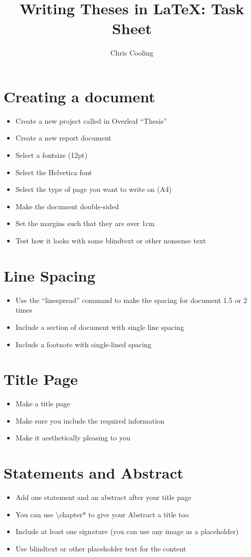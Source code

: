 \documentclass[11pt,a4paper]{article}
\begin{document}
\title{Writing Theses in \LaTeX: Task Sheet}
\author{Chris Cooling}
\maketitle
\pagestyle{empty}
\thispagestyle{empty}

\section{Creating a document}
\begin{itemize}
\item Create a new project called in Overleaf ``Thesis''
\item Create a new report document
\item Select a fontsize (12pt)
\item Select the Helvetica font
\item Select the type of page you want to write on (A4)
\item Make the document double-sided
\item Set the margins such that they are over 1cm
\item Test how it looks with some blindtext or other nonsense text
\end{itemize}

\section{Line Spacing}
\begin{itemize}
\item Use the ``linespread'' command to make the spacing for document 1.5 or 2 times
\item Include a section of document with single line spacing
\item Include a footnote with single-lined spacing
\end{itemize}

\section{Title Page}
\begin{itemize}
\item Make a title page 
\item Make sure you include the required information
\item Make it aesthetically pleasing to you
\end{itemize}

\section{Statements and Abstract}
\begin{itemize}
\item Add one statement and an abstract after your title page
\item You can use \textbackslash chapter* to give your Abstract a title too
\item Include at least one signature (you can use any image as a placeholder)
\item Use blindtext or other placeholder text for the content
\end{itemize}
\end{document}

